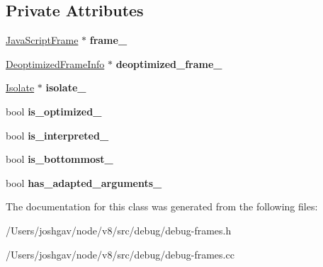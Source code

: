 \subsection*{Private Attributes}
\begin{DoxyCompactItemize}
\item 
\hyperlink{classv8_1_1internal_1_1_java_script_frame}{Java\+Script\+Frame} $\ast$ {\bfseries frame\+\_\+}\hypertarget{classv8_1_1internal_1_1_frame_inspector_a2276a1ea5fb162fff909a380ce545644}{}\label{classv8_1_1internal_1_1_frame_inspector_a2276a1ea5fb162fff909a380ce545644}

\item 
\hyperlink{classv8_1_1internal_1_1_deoptimized_frame_info}{Deoptimized\+Frame\+Info} $\ast$ {\bfseries deoptimized\+\_\+frame\+\_\+}\hypertarget{classv8_1_1internal_1_1_frame_inspector_a9fbab08a727db02333f90890a4201283}{}\label{classv8_1_1internal_1_1_frame_inspector_a9fbab08a727db02333f90890a4201283}

\item 
\hyperlink{classv8_1_1internal_1_1_isolate}{Isolate} $\ast$ {\bfseries isolate\+\_\+}\hypertarget{classv8_1_1internal_1_1_frame_inspector_aa23c9a1a5caedb5dfb001d90ecb75b1f}{}\label{classv8_1_1internal_1_1_frame_inspector_aa23c9a1a5caedb5dfb001d90ecb75b1f}

\item 
bool {\bfseries is\+\_\+optimized\+\_\+}\hypertarget{classv8_1_1internal_1_1_frame_inspector_a92dcf07f000bb2598d9d74a8527fcfa1}{}\label{classv8_1_1internal_1_1_frame_inspector_a92dcf07f000bb2598d9d74a8527fcfa1}

\item 
bool {\bfseries is\+\_\+interpreted\+\_\+}\hypertarget{classv8_1_1internal_1_1_frame_inspector_a005a49051f0c0770569c27e9f71b6e5f}{}\label{classv8_1_1internal_1_1_frame_inspector_a005a49051f0c0770569c27e9f71b6e5f}

\item 
bool {\bfseries is\+\_\+bottommost\+\_\+}\hypertarget{classv8_1_1internal_1_1_frame_inspector_afa757544f3515c5a0865a1715bf83a1c}{}\label{classv8_1_1internal_1_1_frame_inspector_afa757544f3515c5a0865a1715bf83a1c}

\item 
bool {\bfseries has\+\_\+adapted\+\_\+arguments\+\_\+}\hypertarget{classv8_1_1internal_1_1_frame_inspector_a2fa03a6d5bca3ed7313101494692f9c1}{}\label{classv8_1_1internal_1_1_frame_inspector_a2fa03a6d5bca3ed7313101494692f9c1}

\end{DoxyCompactItemize}


The documentation for this class was generated from the following files\+:\begin{DoxyCompactItemize}
\item 
/\+Users/joshgav/node/v8/src/debug/debug-\/frames.\+h\item 
/\+Users/joshgav/node/v8/src/debug/debug-\/frames.\+cc\end{DoxyCompactItemize}
